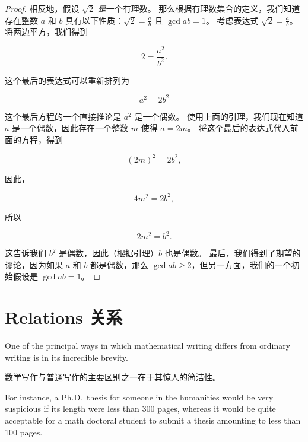 \begin{proof}
相反地，假设 $\sqrt{2}$ {\em 是}一个有理数。
那么根据有理数集合的定义，我们知道存在整数 $a$ 和 $b$ 具有以下性质：$\displaystyle \sqrt{2} = \frac{a}{b}$ 且 $\gcd{a}{b} = 1$。
考虑表达式 $\displaystyle \sqrt{2} = \frac{a}{b}$。将两边平方，我们得到

\[ 2 = \frac{a^2}{b^2}.
\]

这个最后的表达式可以重新排列为

\begin{equation*}
a^2 = 2 b^2
\end{equation*}

这个最后方程的一个直接推论是 $a^2$ 是一个偶数。
使用上面的引理，我们现在知道 $a$ 是一个偶数，因此存在一个整数 $m$ 使得 $a=2m$。
将这个最后的表达式代入前面的方程，得到

\begin{equation*}
(2m)^2 = 2 b^2,
\end{equation*}

因此，

\begin{equation*}
4m^2 = 2 b^2,
\end{equation*}

所以

\begin{equation*}
2m^2 = b^2.
\end{equation*}

这告诉我们 $b^2$ 是偶数，因此（根据引理）$b$ 也是偶数。
最后，我们得到了期望的谬论，因为如果 $a$ 和 $b$ 都是偶数，那么 $\gcd{a}{b} \geq 2$，但另一方面，我们的一个初始假设是 $\gcd{a}{b} = 1$。
\end{proof}

\newpage




\newpage

\section{Relations 关系}
\label{sec:rel_intro}

One of the principal ways in which mathematical writing
differs from ordinary writing is in its incredible brevity.

数学写作与普通写作的主要区别之一在于其惊人的简洁性。

For
instance, a Ph.D.\ thesis for someone in the humanities would be very 
suspicious if its length were less than 300 pages, whereas it would
be quite acceptable for a math doctoral student to submit a thesis
amounting to less than 100 pages.

